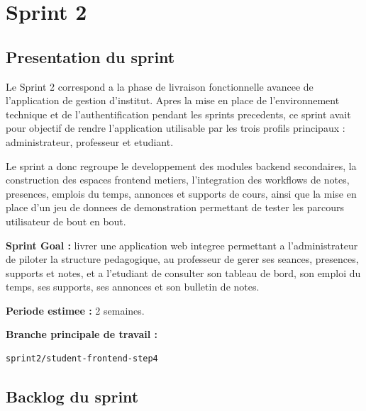 \documentclass[12pt,a4paper]{report}
\begin{document}
\fi

\newpage
\chapter{Sprint 2}

\section{Presentation du sprint}

Le Sprint 2 correspond a la phase de livraison fonctionnelle avancee de l'application de gestion d'institut. Apres la mise en place de l'environnement technique et de l'authentification pendant les sprints precedents, ce sprint avait pour objectif de rendre l'application utilisable par les trois profils principaux : administrateur, professeur et etudiant.

Le sprint a donc regroupe le developpement des modules backend secondaires, la construction des espaces frontend metiers, l'integration des workflows de notes, presences, emplois du temps, annonces et supports de cours, ainsi que la mise en place d'un jeu de donnees de demonstration permettant de tester les parcours utilisateur de bout en bout.

\textbf{Sprint Goal :} livrer une application web integree permettant a l'administrateur de piloter la structure pedagogique, au professeur de gerer ses seances, presences, supports et notes, et a l'etudiant de consulter son tableau de bord, son emploi du temps, ses supports, ses annonces et son bulletin de notes.

\textbf{Periode estimee :} 2 semaines.

\textbf{Branche principale de travail :}

\begin{verbatim}
sprint2/student-frontend-step4
\end{verbatim}

\section{Backlog du sprint}
\end{document}
